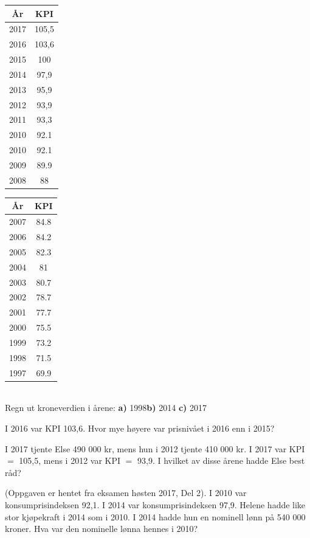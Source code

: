 




	
\opgt
\vspace{11pt}
\parbox{0.25\linewidth}{	\begin{tabular}{c|c}
		År &  KPI \\ \hline
		2017&	105,5\\
		2016&	103,6\\
		2015&	100\\
		2014&	97,9\\
		2013&	95,9\\
		2012&	93,9\\
		2011&	93,3\\
		2010&	92.1\\
		2010&	92.1\\
		2009&	89.9\\
		2008&	88\\
\end{tabular}}
\parbox{0.45\linewidth}{	\begin{tabular}{c|c}
		År &  KPI \\ \hline

		2007&	84.8\\
		2006&	84.2\\
		2005&	82.3\\
		2004&	81\\
		2003&	80.7\\
		2002&	78.7\\
		2001&	77.7\\
		2000&	75.5\\
		1999&	73.2\\
		1998&	71.5\\
		1997&	69.9
		
\end{tabular}}\\

Regn ut kroneverdien i årene:\os
\textbf{a)} 1998\qquad \textbf{b)} 2014 \qquad \textbf{c)} 2017


I 2016 var KPI 103,6. Hvor mye høyere var prisnivået i 2016 enn i 2015?

I 2017 tjente Else 490 000 kr, mens hun i 2012 tjente 410 000 kr. I
2017 var KPI $ = $ 105,5, mens i 2012 var KPI $ = $ 93,9. I hvilket av disse årene hadde Else best råd?

(Oppgaven er hentet fra eksamen høsten 2017, Del 2).\os
I 2010 var konsumprisindeksen 92,1. I 2014 var konsumprisindeksen 97,9.
Helene hadde like stor kjøpekraft i 2014 som i 2010.
I 2014 hadde hun en nominell lønn på 540 000 kroner.
Hva var den nominelle lønna hennes i 2010?


